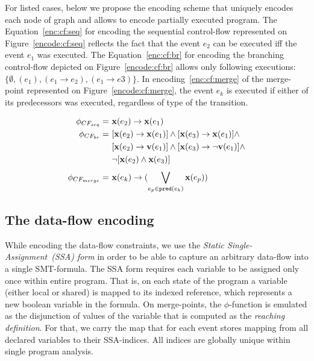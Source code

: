 For listed cases, below we propose the encoding scheme that uniquely encodes each node of graph and allows to encode partially executed program.
The Equation~\ref{enc:cf:seq} for encoding the sequential control-flow represented on Figure~\ref{encode:cf:seq} reflects the fact that the event $e_2$ can be executed iff the event $e_1$ was executed. The Equation~\ref{enc:cf:br} for encoding the branching control-flow depicted on Figure~\ref{encode:cf:br} allows only following executions: $\{\emptyset, (e_1), (e_1 \rightarrow e_2), (e_1 \rightarrow e3) \}$. In encoding~\ref{enc:cf:merge} of the merge-point represented on Figure~\ref{encode:cf:merge}, the event $e_k$ is executed if either of its predecessors was executed, regardless of type of the transition.

\begin{align}
\phi_{CF_{seq}}   = \ & \mathbf{x}(e_2) \rightarrow \mathbf{x}(e_1) \label{enc:cf:seq} \\
\phi_{CF_{br}}    = \ & [\mathbf{x}(e_2) \rightarrow \mathbf{x}(e_1)] \land [\mathbf{x}(e_3) \rightarrow \mathbf{x}(e_1)] \land \nonumber \\
				  &  [\mathbf{x}(e_2) \rightarrow \mathbf{v}(e_1)] \land [\mathbf{x}(e_3) \rightarrow \lnot\mathbf{v}(e_1)] \land \nonumber \\
				  & \lnot [\mathbf{x}(e_2) \land \mathbf{x}(e_3)]  \label{enc:cf:br} \\
\phi_{CF_{merge}} = \ & \mathbf{x}(e_k) \rightarrow (\bigvee\limits_{e_p \in \mathtt{pred}(e_k)}^{} \mathbf{x}(e_p)) \label{enc:cf:merge}
\end{align}

\subsection{The data-flow encoding} %
\label{ch:port:enc:df}

While encoding the data-flow constraints, we use the \textit{Static Single-Assignment~(SSA) form} in order to be able to capture an arbitrary data-flow into a single SMT-formula. The SSA form requires each variable to be assigned only once within entire program. That is, on each state of the program a variable (either local or shared) is mapped to its indexed reference, which represents a new boolean variable in the formula. On merge-points, the $\phi$-function is emulated as the disjunction of values of the variable that is computed as the \textit{reaching definition}. For that, we carry the map that for each event stores mapping from all declared variables to their SSA-indices. All indices are globally unique within single program analysis.

